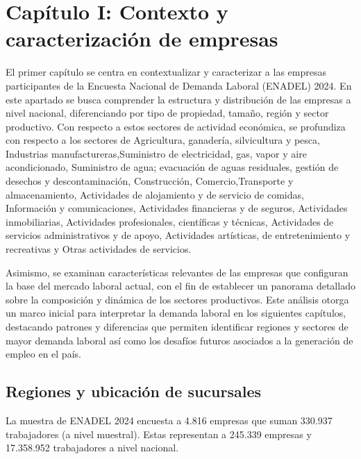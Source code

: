 \documentclass[
  11pt,
]{article}
\begin{document}
\section{Capítulo I: Contexto y caracterización de
empresas}\label{capuxedtulo-i-contexto-y-caracterizaciuxf3n-de-empresas}

El primer capítulo se centra en contextualizar y caracterizar a las
empresas participantes de la Encuesta Nacional de Demanda Laboral
(ENADEL) 2024. En este apartado se busca comprender la estructura y
distribución de las empresas a nivel nacional, diferenciando por tipo de
propiedad, tamaño, región y sector productivo. Con respecto a estos
sectores de actividad económica, se profundiza con respecto a los
sectores de Agricultura, ganadería, silvicultura y pesca, Industrias
manufactureras,Suministro de electricidad, gas, vapor y aire
acondicionado, Suministro de agua; evacuación de aguas residuales,
gestión de desechos y descontaminación, Construcción,
Comercio,Transporte y almacenamiento, Actividades de alojamiento y de
servicio de comidas, Información y comunicaciones, Actividades
financieras y de seguros, Actividades inmobiliarias, Actividades
profesionales, científicas y técnicas, Actividades de servicios
administrativos y de apoyo, Actividades artísticas, de entretenimiento y
recreativas y Otras actividades de servicios.

Asimismo, se examinan características relevantes de las empresas que
configuran la base del mercado laboral actual, con el fin de establecer
un panorama detallado sobre la composición y dinámica de los sectores
productivos. Este análisis otorga un marco inicial para interpretar la
demanda laboral en los siguientes capítulos, destacando patrones y
diferencias que permiten identificar regiones y sectores de mayor
demanda laboral así como los desafíos futuros asociados a la generación
de empleo en el país.

\FloatBarrier

\newpage

\subsection{Regiones y ubicación de
sucursales}\label{regiones-y-ubicaciuxf3n-de-sucursales}

La muestra de ENADEL 2024 encuesta a 4.816 empresas que suman 330.937
trabajadores (a nivel muestral). Estas representan a 245.339 empresas y
17.358.952 trabajadores a nivel nacional.
\end{document}
